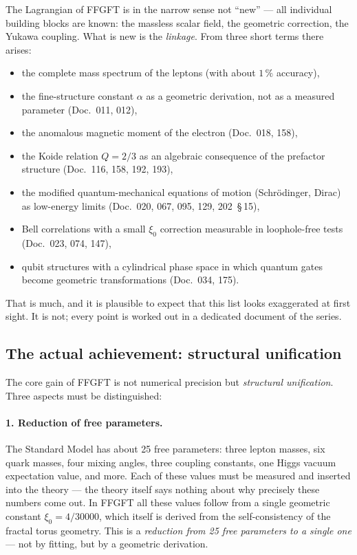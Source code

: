 The Lagrangian of FFGFT is in the narrow sense not \enquote{new}
--- all individual building blocks are known: the massless scalar
field, the geometric correction, the Yukawa coupling. What is new
is the \emph{linkage}. From three short terms there arises:
\begin{itemize}
  \item the complete mass spectrum of the leptons (with about
        $1\,\%$ accuracy),
  \item the fine-structure constant $\alpha$ as a geometric
        derivation, not as a measured parameter (Doc.~011, 012),
  \item the anomalous magnetic moment of the electron
        (Doc.~018, 158),
  \item the Koide relation $Q = 2/3$ as an algebraic consequence of
        the prefactor structure (Doc.~116, 158, 192, 193),
  \item the modified quantum-mechanical equations of motion
        (Schrödinger, Dirac) as low-energy limits
        (Doc.~020, 067, 095, 129, 202~\S\,15),
  \item Bell correlations with a small $\xi_0$ correction
        measurable in loophole-free tests (Doc.~023, 074, 147),
  \item qubit structures with a cylindrical phase space in which
        quantum gates become geometric transformations
        (Doc.~034, 175).
\end{itemize}

That is much, and it is plausible to expect that this list looks
exaggerated at first sight. It is not; every point is worked out
in a dedicated document of the series.

\subsection*{The actual achievement: structural unification}

The core gain of FFGFT is not numerical precision but
\emph{structural unification}. Three aspects must be distinguished:

\paragraph{1. Reduction of free parameters.}
The Standard Model has about 25 free parameters: three lepton
masses, six quark masses, four mixing angles, three coupling
constants, one Higgs vacuum expectation value, and more. Each of
these values must be measured and inserted into the theory --- the
theory itself says nothing about why precisely these numbers come
out. In FFGFT all these values follow from a single geometric
constant $\xi_0 = 4/30000$, which itself is derived from the
self-consistency of the fractal torus geometry. This is a
\emph{reduction from 25 free parameters to a single one} --- not by
fitting, but by a geometric derivation.

